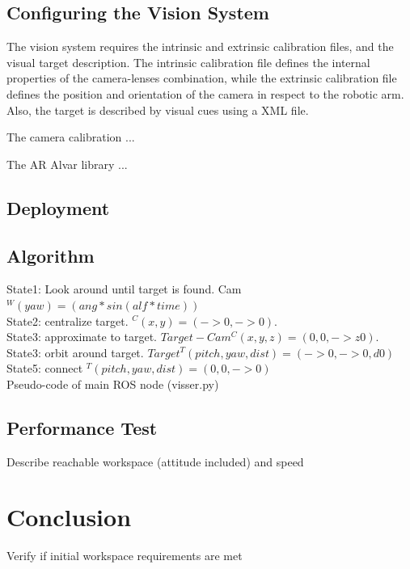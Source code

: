 \documentclass[11pt]{article}
\begin{document}
    \subsection{Configuring the Vision System}
        The vision system requires the intrinsic and extrinsic calibration files, and the visual target description. The intrinsic calibration file defines the internal properties of the camera-lenses combination, while the extrinsic calibration file defines the position and orientation of the camera in respect to the robotic arm. Also, the target is described by visual cues using a XML file.
        
        The camera calibration ... %
        
        The AR Alvar library ... %
        
    \subsection{Deployment}
        
        
    \subsection{Algorithm}
        State1: Look around until target is found. Cam $^W(yaw) = (ang*sin(alf*time))$\\
        State2: centralize target. $^C(x,y) = (->0, ->0).$\\
        State3: approximate to target. $Target-Cam ^C(x,y,z) = (0,0,->z0). $\\
        State3: orbit around target. $Target ^T(pitch,yaw,dist) = (->0,->0,d0)$\\
        State5: connect $^T(pitch,yaw,dist) = (0,0,->0)$\\
        
        Pseudo-code of main ROS node (visser.py)
    
    \subsection{Performance Test}
        Describe reachable workspace (attitude included) and speed

\section{Conclusion}
    Verify if initial workspace requirements are met
\end{document}
